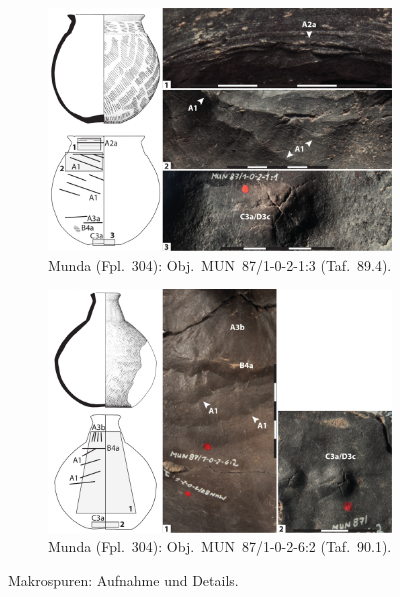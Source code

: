 \begin{multicols}{2}
\begin{figure}[p]
	\centering
	\begin{subfigure}{\textwidth}
		\centering
		\includegraphics[width = \textwidth]{fig/Abb_Macrotraces/MUN87-1-0-2-1-1.pdf}
		\caption{Munda (Fpl.~304): Obj.~MUN~87/1-0-2-1:3 (Taf.~89.4).\vspace{1em}}
		\label{MUN87-1-0-2-1-3_Makrospuren}
	\end{subfigure}
	\begin{subfigure}{\textwidth}
		\centering
		\includegraphics[width = \textwidth]{fig/Abb_Macrotraces/MUN87-1-0-2-6-2.pdf}
		\caption{Munda (Fpl.~304): Obj.~MUN~87/1-0-2-6:2 (Taf.~90.1).}
		\label{MUN87-1-0-2-6-2_Makrospuren}
	\end{subfigure}
	\caption{Makrospuren: Aufnahme und Details.}
\end{figure}


\end{multicols}
